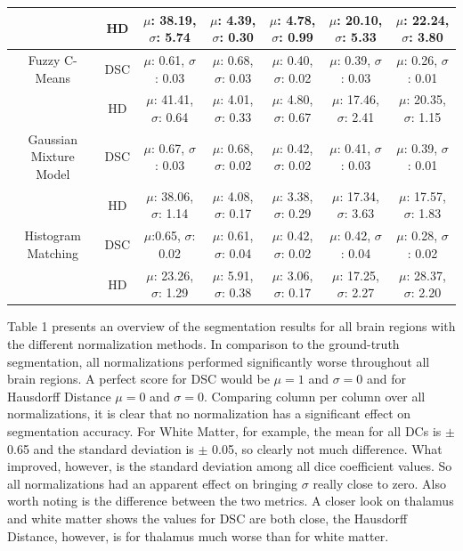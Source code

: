 \documentclass[journal]{IEEEtran}
\begin{document}
\begin{table}[!ht]
\begin{center}
\begin{threeparttable}
\begin{tabular}{c c c c c c c}
								&	HD	&	$\mu$: 38.19, $\sigma$: 5.74	&	$\mu$: 4.39, $\sigma$: 0.30		&	$\mu$: 4.78, $\sigma$: 0.99		&	$\mu$: 20.10, $\sigma$: 5.33	&	$\mu$: 22.24, $\sigma$: 3.80 	\\ \midrule
		Fuzzy C-Means 			&	DSC	&	$\mu$: 0.61, $\sigma$: 0.03		&	$\mu$: 0.68, $\sigma$: 0.03		&	$\mu$: 0.40, $\sigma$: 0.02		&	$\mu$: 0.39, $\sigma$: 0.03		&	$\mu$: 0.26, $\sigma$: 0.01 	\\ \cmidrule(lr{1em}){2-7}
								&	HD	&	$\mu$: 41.41, $\sigma$: 0.64	&	$\mu$: 4.01, $\sigma$: 0.33		&	$\mu$: 4.80, $\sigma$: 0.67		&	$\mu$: 17.46, $\sigma$: 2.41	&	$\mu$: 20.35, $\sigma$: 1.15 	\\ \midrule
		Gaussian Mixture Model 	&	DSC	&	$\mu$: 0.67, $\sigma$: 0.03		&	$\mu$: 0.68, $\sigma$: 0.02 	& 	$\mu$: 0.42, $\sigma$: 0.02		& 	$\mu$: 0.41, $\sigma$: 0.03 	& 	$\mu$: 0.39, $\sigma$: 0.01 	\\ \cmidrule(lr{1em}){2-7}
								&	HD	& 	$\mu$: 38.06, $\sigma$: 1.14 	& 	$\mu$: 4.08, $\sigma$: 0.17 	& 	$\mu$: 3.38, $\sigma$: 0.29 	& 	$\mu$: 17.34, $\sigma$: 3.63 	& 	$\mu$: 17.57, $\sigma$: 1.83 	\\ \midrule
		Histogram Matching	 	&	DSC	& 	$\mu$:0.65, $\sigma$: 0.02 		& 	$\mu$: 0.61, $\sigma$: 0.04 	& 	$\mu$: 0.42, $\sigma$: 0.02 	& 	$\mu$: 0.42, $\sigma$: 0.04		& 	$\mu$: 0.28, $\sigma$: 0.02 	\\ \cmidrule(lr{1em}){2-7}
								&	HD	& 	$\mu$: 23.26, $\sigma$: 1.29	&  	$\mu$: 5.91, $\sigma$: 0.38 	& 	$\mu$: 3.06, $\sigma$: 0.17 	& 	$\mu$: 17.25, $\sigma$: 2.27	& 	$\mu$: 28.37, $\sigma$: 2.20 	\\  \bottomrule
	\end{tabular}
	\end{threeparttable}
	\end{center}
	\label{table:simDisimCoefNewDef}
\end{table}

\twocolumn
Table 1 presents an overview of the segmentation results for all brain regions with the different normalization methods. 
In comparison to the ground-truth segmentation, all normalizations performed significantly worse throughout all brain regions.
A perfect score for DSC would be $\mu = 1$ and $\sigma = 0$ and for Hausdorff Distance $\mu = 0$ and $\sigma = 0$.
Comparing column per column over all normalizations, it is clear that no normalization has a significant effect on segmentation accuracy.
For White Matter, for example, the mean for all DCs is $\pm$ 0.65 and the standard deviation is $\pm$ 0.05, so clearly not much difference.
What improved, however, is the standard deviation among all dice coefficient values. So all normalizations had an apparent effect on bringing $\sigma$ really close to zero.
Also worth noting is the difference between the two metrics. A closer look on thalamus and white matter shows the values for DSC are both close,
the Hausdorff Distance, however, is for thalamus much worse than for white matter.\\
\end{document}
